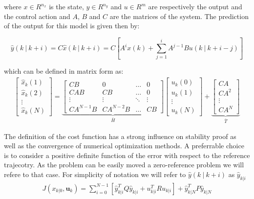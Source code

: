 where $x \in R^{n_x}$ is the state, $y \in R^{n_y}$ and $u \in R^m$ are respectively the output and the control action and $A$, $B$ and $C$ are the matrices of the system. The prediction of the output for this model is given then by:

\begin{equation}\label{system_prediction}
	\hat{y}(k\ |\ k+i)=C\hat{x}(k\ |\ k+i)=C\left[A^i x(k) + \sum_{j=1}^{i} A^{j-1}Bu(k\ |\ k+i-j)\right]
\end{equation}

which can be defined in matrix form as: 
\begin{equation}
\begin{split}
	\left[ \begin{matrix} \hat{x}_k(1) \\ \hat{x}_k(2) \\ \vdots \\ \hat{x}_k(N) \end{matrix} \right] = \underbrace{\left[ \begin{matrix}
	CB		 & 	0	    &	\dots	&	0 		\\
	CAB		 & 	CB	    &	\dots	&	0 		\\
	\vdots	 &  \vdots  &	\ddots	&	\vdots	\\
	CA^{N-1}B & CA^{N-2}B &   \dots   &	CB			
	\end{matrix}\right]}_{\bar{H}}\left[ \begin{matrix} u_k(0) \\ u_k(1) \\ \vdots \\ u_k(N) \end{matrix} \right]+ \underbrace{\left[ \begin{matrix} CA \\ CA^2 \\ \vdots \\ CA^N \end{matrix} \right]}_{\bar{T}}
	\end{split}	
\end{equation}

The definition of the cost function has a strong influence on stability proof as well as the convergence of numerical optimization methods. A preferrable choice is to consider a positive definite function of the error with respect to the reference trajecotry. As the problem can be easily moved a zero-reference problem we will refere to that case. For simplicity of notation we will refer to $\hat{y}(k\ |\ k+i)$ as $\hat{y}_{k|i}$
\begin{equation} \label{costfunction}
	\begin{split}
		J(x_{k|0},\textbf{u}_k) = \sum_{i=0}^{N-1} \left[\hat{y}_{k|i}^T Q \hat{y}_{k|i} + u_{k|i}^TRu_{k|i} \right] + \hat{y}_{k|N}^T P \hat{y}_{k|N}
	\end{split}	
\end{equation}

